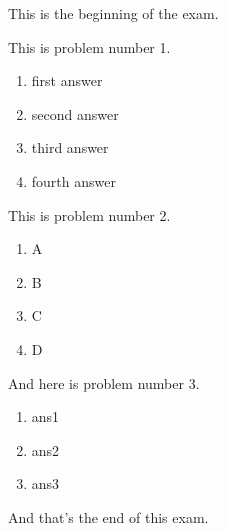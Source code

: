 \documentclass{article}
\begin{document}
This is the beginning of the exam.

\begin{problem}
  This is problem number 1.

  \begin{enumerate}
  \item first answer
  \item second answer
  \item third answer
  \item fourth answer
  \end{enumerate}
\end{problem}

\begin{problem}
  This is problem number 2.
  \begin{enumerate}
  \item A
  \item B
  \item C
  \item D
  \end{enumerate}
\end{problem}

\begin{problem}
  And here is problem number 3.
  \begin{enumerate}
  \item ans1
  \item ans2
  \item ans3
  \end{enumerate}
\end{problem}

And that's the end of this exam.
\end{document}
